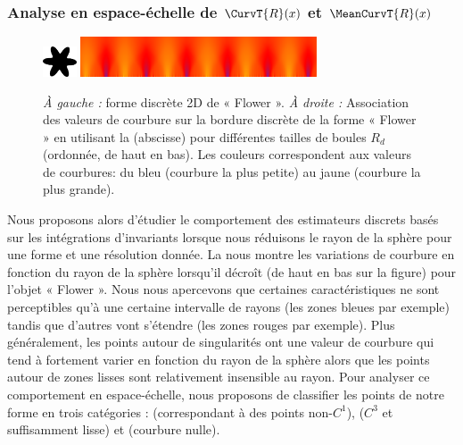 \subsubsection{Analyse en espace-échelle de $\CurvT{R}(x)$ et $\MeanCurvT{R}(x)$}%
\label{sec:applications:feature:II:analyse}
%
\begin{figure}[ht]{
      \begin{center}
          \includegraphics[width=1cm]{images/Flower}
          \includegraphics[width=7cm]{images/ScaleSpace_Flower}
      \end{center}}
%
      \caption[Analyse en espace-échelle de la courbure en fonction du rayon sur la forme discrète 2D de « Flower »]
      {\emph{À gauche :} forme discrète 2D de « Flower ». \emph{À droite :}
      Association des valeurs de courbure sur la bordure discrète de la forme «
      Flower » en utilisant la  (abscisse) pour différentes
      tailles de boules $R_d$ (ordonnée, de haut en bas). Les couleurs correspondent
      aux valeurs de courbures: du bleu (courbure la plus petite) au jaune (courbure
      la plus grande).\label{fig:curvature-scale-2d}}
\end{figure}
%
Nous proposons alors d'étudier le comportement des estimateurs discrets basés
sur les intégrations d'invariants lorsque nous réduisons le rayon de la sphère
pour une forme et une résolution donnée. La 
nous montre les variations de courbure en fonction du rayon de la sphère
lorsqu'il décroît (de haut en bas sur la figure) pour l'objet « Flower ». Nous
nous apercevons que certaines caractéristiques ne sont perceptibles qu'à une
certaine intervalle de rayons (les zones bleues par exemple) tandis que d'autres
vont s'étendre (les zones rouges par exemple). Plus généralement, les points
autour de singularités ont une valeur de courbure qui tend à fortement varier en
fonction du rayon de la sphère alors que les points autour de zones lisses sont
relativement insensible au rayon. Pour analyser ce comportement en
espace-échelle, nous proposons de classifier les points de notre forme en trois
catégories : \featedge (correspondant à des points non-$C^1$), \featsmooth
($C^3$ et suffisamment lisse) et \featflat (courbure nulle).
